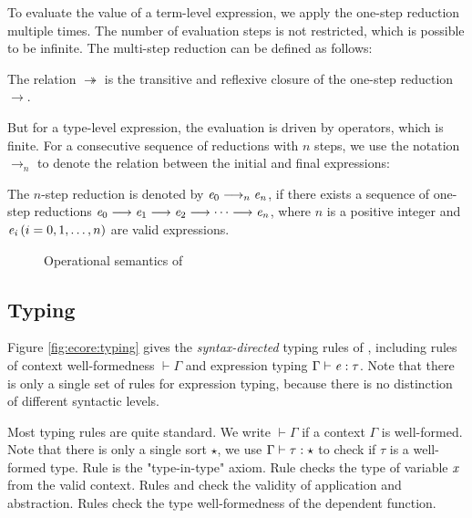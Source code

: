 To evaluate the value of a term-level expression, we apply the one-step reduction multiple times. The number of evaluation steps is not restricted, which is possible to be infinite. The multi-step reduction can be defined as follows:
\begin{dfn}
    The relation $ \twoheadrightarrow $ is the transitive and reflexive closure of the one-step reduction $ \longrightarrow $.
\end{dfn}

But for a type-level expression, the evaluation is driven by \cast operators, which is finite. For a consecutive sequence of reductions with $n$ steps, we use the notation $ \longrightarrow_n $ to denote the relation between the initial and final expressions:
\begin{dfn}
    The $n$-step reduction is denoted by $\mathit{e_{{\mathrm{0}}}}  \longrightarrow_n  \mathit{e_{\mathit{n}}}$, if there exists a sequence of one-step reductions $\mathit{e_{{\mathrm{0}}}}  \longrightarrow  \mathit{e_{{\mathrm{1}}}}  \longrightarrow  \mathit{e_{{\mathrm{2}}}}  \longrightarrow  \dots  \longrightarrow  \mathit{e_{\mathit{n}}}$, where $n$ is a positive integer and $\mathit{e_{\mathit{i}}}\,(i=0,1,\dots,n)$ are valid expressions.
\end{dfn}

\begin{figure}
    \ottdefnstep{}
    \caption{Operational semantics of \ecore}
    \label{fig:ecore:opsem}
\end{figure}

\subsection{Typing}\label{sec:ecore:type}
Figure \ref{fig:ecore:typing} gives the \emph{syntax-directed} typing rules of \ecore, including rules of context well-formedness $\vdash  \Gamma$ and expression typing $\Gamma  \vdash  \mathit{e}  :  \tau$. Note that there is only a single set of rules for expression typing, because there is no distinction of different syntactic levels.

Most typing rules are quite standard. We write $\vdash  \Gamma$ if a context $\Gamma$ is well-formed. Note that there is only a single sort $\star$, we use $\Gamma  \vdash  \tau  :  \star$ to check if $\tau$ is a well-formed type. Rule  is the "type-in-type" axiom. Rule  checks the type of variable $\mathit{x}$ from the valid context. Rules  and  check the validity of application and abstraction. Rules  check the type well-formedness of the dependent function.

